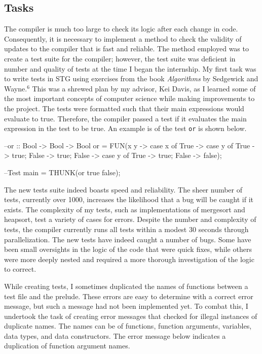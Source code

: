 \documentclass[11pt]{article}
\begin{document}
\subsection{Tasks}

The compiler is much too large to check its logic after each change in
code. Consequently, it is necessary to implement a method to check the
validity of updates to the compiler that is fast and reliable. The method employed was to create a test suite for the compiler; however, the test suite was deficient
in number and quality of tests at the time I began the internship. My first task was to write tests in STG using
exercises from the book \textit{Algorithms} by Sedgewick and Wayne.$^6$ This was a shrewed plan by my advisor, Kei Davis, as I learned some of the most important
concepts of computer science while making improvements to the project. The
tests were formatted such that their main expressions would evaluate to
true. Therefore, the compiler passed a test if it evaluates the main
expression in the test to be true. An example is of the test \texttt{or} is shown below.

\hspace{3cm}\begin{verbbox}
--or :: Bool -> Bool -> Bool
or = FUN(x y -> case x of {
                         True -> case y of {
	                	      True -> true;
				      False -> true};
                         False -> case y of {
			      	      True -> true;
				      False -> false}});

--Test
main = THUNK(or true false);
\end{verbbox}
\theverbbox

The new tests suite indeed boasts speed and reliability. The sheer number of
tests, currently over 1000, increases the likelihood that a bug will be caught
if it exists. The complexity of my tests, such as implementations of mergesort
and heapsort, test a variety of cases for errors. Despite the number and
complexity of tests, the compiler currently runs all tests within a modest 30
seconds through parallelization. The new tests have indeed caught a number of
bugs. Some have been small oversights in the logic of the code that were quick
fixes, while others were more deeply nested and required a more thorough
investigation of the logic to correct.

While creating tests, I sometimes duplicated the names of functions between a
test file and the prelude. These errors are easy to determine with a correct
error message, but such a message had not been implemented yet. To combat this, I undertook
the task of creating error messages that checked for illegal instances of
duplicate names. The names can be of functions, function arguments, variables,
data types, and data constructors. The error message below indicates a duplication of function argument names.
\end{document}
